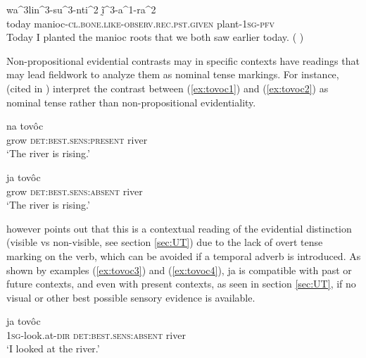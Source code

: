 \documentclass[oneside,a4paper,11pt]{article}
\newcommand{\ipa}[1]{{\phon \mbox{#1}}} %
\begin{document}
\begin{exe}
\ex \label{ex:walinsunti}
\gll  \ipa{hĩ^1na^2su^2} \ipa{wa^3lin^3-su^3-nti^2} \ipa{ḭ̃^3-a^1-ra^2} \\
today manioc-\textsc{cl.bone.like-observ.rec.pst.given} plant-\textsc{1sg-pfv} \\
\glt Today I planted the manioc roots that we both saw earlier today. (\citealt[290, ex 62.]{lowe99nambiquara} ) 
  \end{exe}

Non-propositional evidential contrasts may in specific contexts have readings that may lead fieldwork to analyze them as nominal tense markings. For instance, \citet[631]{campbell12chaco} (cited in \citealt{gutierrez14determiners}) interpret the contrast between (\ref{ex:tovoc1}) and (\ref{ex:tovoc2}) as nominal tense rather than non-propositional evidentiality.

\begin{exe}
\ex \label{ex:tovoc1}
\gll \ipa{tsej} \ipa{na} \ipa{tovôc} \\
  grow \textsc{det:best.sens:present} river \\
\glt `The river is rising.'
\end{exe}


\begin{exe}
\ex \label{ex:tovoc2}
\gll \ipa{tsej} \ipa{ja} \ipa{tovôc} \\
 grow \textsc{det:best.sens:absent} river \\
\glt `The river is rising.'
\end{exe}

\citet{gutierrez14determiners} however points out that this is a contextual reading of the evidential distinction (visible vs non-visible, see section \ref{sec:UT}) due to the lack of overt tense marking on the verb, which can be avoided if a temporal adverb is introduced. As shown by examples (\ref{ex:tovoc3}) and (\ref{ex:tovoc4}), \ipa{ja} is compatible with past or future contexts, and even with present contexts, as seen in section \ref{sec:UT}, if no visual or other best possible sensory evidence is available.


\begin{exe}
\ex \label{ex:tovoc3}
\gll \ipa{j-ovalh-ei} \ipa{ja} \ipa{tovôc} \\
 \textsc{1sg}-look.at-\textsc{dir} \textsc{det:best.sens:absent} river \\
\glt `I looked at the river.'
\end{exe}
\end{document}
